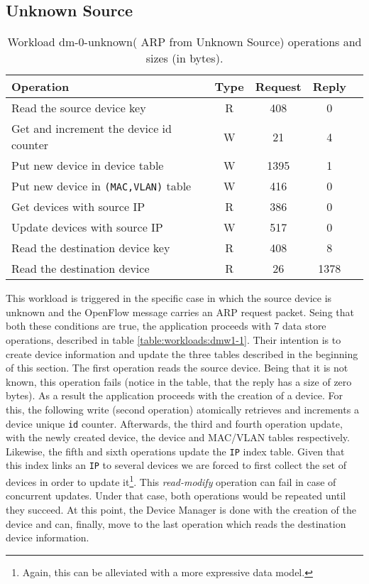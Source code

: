 \documentclass[12pt,openright,twoside]{report}
\begin{document}
\subsection{Unknown Source}
\begin{table}[H]
\centering 
\begin{tabular}{l c c c c}

 Operation & Type & Request & Reply \\ \toprule 

 Read the source device key & R & 408 & 0\\\midrule
Get and increment the device id counter & W & 21 & 4\\\midrule
Put new device in device table & W & 1395 & 1\\\midrule
Put new device in \texttt{(MAC,VLAN)} table & W & 416 & 0\\\midrule
Get devices with source IP & R & 386 & 0\\\midrule
Update devices with source IP & W & 517 & 0\\\midrule
Read the destination device key & R & 408 & 8\\\midrule
Read the destination device & R & 26 & 1378 \\\bottomrule
\end{tabular}
\caption[Workload dm-0-unknown( ARP from Unknown Source)
operations]{Workload dm-0-unknown( ARP from Unknown Source) operations
  and sizes (in bytes).}
\end{table}


This workload is triggered in the specific case in which  the source device
is unknown and the OpenFlow message carries an ARP request
packet. Seing that both these  conditions are true, the application
proceeds  with 7 data store operations, described in table
\ref{table:workloads:dmw1-1}. Their intention is to  create device
information and update the three tables described  in the beginning
of this section.  The first operation reads the  source device. Being
that it  is not known, this operation fails (notice in the table, that
the reply has a size  of zero bytes). As a result the application
proceeds with the creation of a device. For this, the
following write (second operation) atomically retrieves
 and increments a device
unique \texttt{id} counter. Afterwards, the third and fourth  operation
update, with the newly created device, the device and MAC/VLAN
tables respectively. Likewise, the fifth and sixth operations update
the \texttt{IP} index table. Given that this index links an \texttt{IP} to
several devices we are forced to first collect the set of devices in
order to update it\footnote{Again, this can be alleviated with a more
  expressive data model.}. This \emph{read-modify} operation can
fail in case of concurrent updates. Under that case, both operations
would be repeated until they succeed. At this point, the Device Manager
is done with the creation of the device and can, finally, move to the
last operation which reads the destination device information. 
\end{document}
